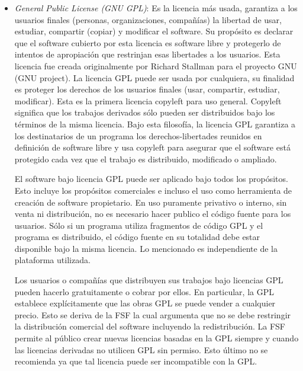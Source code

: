 \begin {itemize}
\item \textit{General Public License (GNU GPL)}: Es la licencia más
  usada, garantiza a los usuarios finales (personas, organizaciones,
  compañías) la libertad de usar, estudiar, compartir (copiar) y
  modificar el software. Su propósito es declarar que el software
  cubierto por esta licencia es software libre y protegerlo de
  intentos de apropiación que restrinjan esas libertades a los
  usuarios. Esta licencia fue creada originalmente por Richard
  Stallman para el proyecto GNU (GNU project). La licencia GPL puede
  ser usada por cualquiera, su finalidad es proteger los derechos de
  los usuarios finales (usar, compartir, estudiar, modificar). Esta es
  la primera licencia copyleft para uso general. Copyleft significa
  que los trabajos derivados sólo pueden ser distribuidos bajo los
  términos de la misma licencia. Bajo esta filosofía, la licencia GPL
  garantiza a los destinatarios de un programa los derechos-libertades
  reunidos en definición de software libre y usa copyleft para
  asegurar que el software está protegido cada vez que el trabajo es
  distribuido, modificado o ampliado.

  El software bajo licencia GPL puede ser aplicado bajo todos los
  propósitos. Esto incluye los propósitos comerciales e incluso el uso
  como herramienta de creación de software propietario. En uso
  puramente privativo o interno, sin venta ni distribución, no es
  necesario hacer publico el código fuente para los usuarios. Sólo si
  un programa utiliza fragmentos de código GPL y el programa es
  distribuido, el código fuente en su totalidad debe estar disponible
  bajo la misma licencia. Lo mencionado es independiente de la
  plataforma utilizada.

  Los usuarios o compañías que distribuyen sus trabajos bajo licencias
  GPL pueden hacerlo gratuitamente o cobrar por ellos. En particular,
  la GPL establece explícitamente que las obras GPL se puede vender a
  cualquier precio. Esto se deriva de la FSF la cual argumenta que no
  se debe restringir la distribución comercial del software incluyendo
  la redistribución. La FSF permite al público crear nuevas licencias
  basadas en la GPL siempre y cuando las licencias derivadas no
  utilicen GPL sin permiso. Esto último no se recomienda ya que tal
  licencia puede ser incompatible con la GPL.


\end{itemize}
